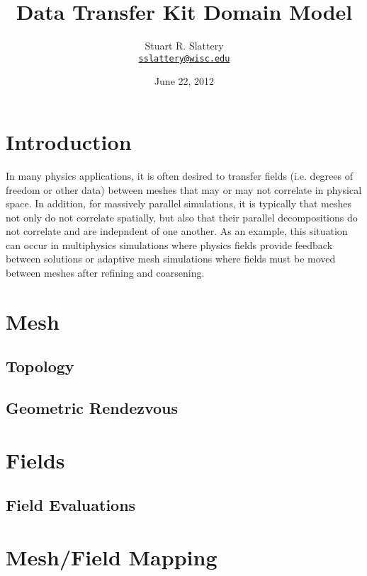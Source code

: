 \documentclass[letterpaper]{article}
\author{Stuart R. Slattery
\\ \href{mailto:sslattery@wisc.edu}{\texttt{sslattery@wisc.edu}}
}
\date{June 22, 2012}
\title{Data Transfer Kit Domain Model}
\begin{document}
\maketitle

\section{Introduction}
In many physics applications, it is often desired to transfer fields
(i.e. degrees of freedom or other data) between meshes that may or may
not correlate in physical space. In addition, for massively parallel
simulations, it is typically that meshes not only do not correlate
spatially, but also that their parallel decompositions do not
correlate and are indepndent of one another. As an example, this
situation can occur in multiphysics simulations where physics fields
provide feedback between solutions or adaptive mesh simulations where
fields must be moved between meshes after refining and coarsening.

\section{Mesh}

\subsection{Topology}

\subsection{Geometric Rendezvous}

\section{Fields}

\subsection{Field Evaluations}

\section{Mesh/Field Mapping}
\end{document}
